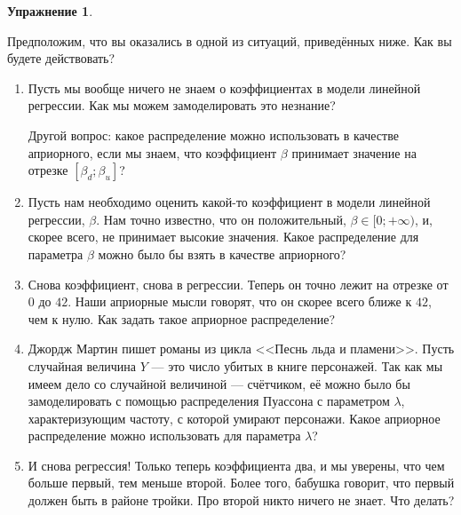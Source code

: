 \documentclass[12pt, a4paper, oneside]{extreport}
\def \b{\beta}
\def \mN{\mathcal{N}}
\theoremstyle{plain}              %
\theoremstyle{definition}         %
\newtheorem{problem}{\color{myblue} Упражнение}
\begin{document}
\begin{problem}\label{upr1}
	
	Предположим, что вы оказались в одной из ситуаций, приведённых ниже. Как вы будете действовать?
	
	\begin{enumerate}
		
		\item Пусть мы вообще ничего не знаем о коэффициентах в модели линейной регрессии. Как мы можем замоделировать это незнание? 
		
		Другой вопрос: какое распределение можно использовать в качестве априорного, если мы знаем, что коэффициент $\beta$ принимает значение на отрезке $[\b_d; \b_u]$?
		
		\item Пусть нам необходимо оценить какой-то коэффициент в модели линейной регрессии, $\beta$. Нам точно известно, что он положительный, $\beta \in [0; +\infty)$, и, скорее всего, не принимает высокие значения. Какое распределение для параметра $\beta$ можно было бы взять в качестве априорного?
		
		\item Снова коэффициент, снова в регрессии. Теперь он точно лежит на отрезке от $0$ до $42$. Наши априорные мысли говорят, что он скорее всего ближе к $42$, чем к нулю. Как задать такое априорное распределение? 
		
		\item Джордж Мартин пишет романы из цикла <<Песнь льда и пламени>>. Пусть случайная величина $Y$ --- это число убитых в книге персонажей. Так как мы имеем дело со случайной величиной --- счётчиком, её можно было бы замоделировать с помощью распределения Пуассона с параметром $\lambda$, характеризующим частоту, с которой умирают персонажи. Какое априорное распределение можно использовать для параметра $\lambda$?
		
		\item И снова регрессия! Только теперь коэффициента два, и мы уверены, что чем больше первый, тем меньше второй. Более того, бабушка говорит, что первый должен быть в районе тройки. Про второй никто ничего не знает. Что делать? 
		
		
	\end{enumerate}
	

\end{problem}
\end{document}
